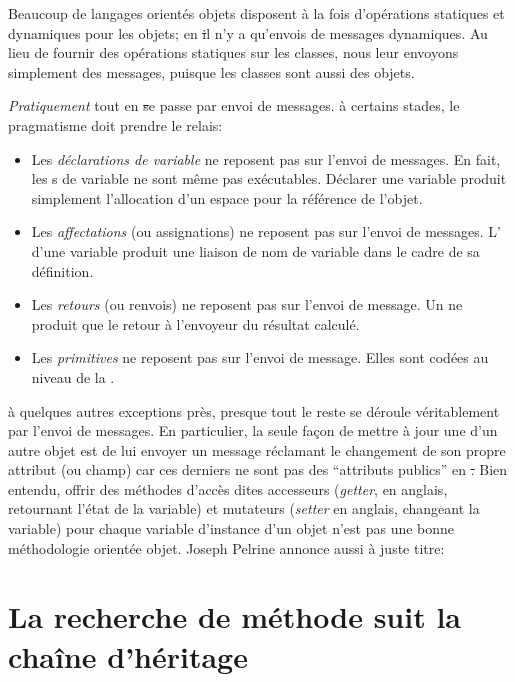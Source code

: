 \documentclass[a4paper,10pt,twoside]{book}
\begin{document}
Beaucoup de langages orientés objets disposent à la fois
d'opérations statiques et dynamiques pour les objets; en \st il n'y
a qu'envois de messages dynamiques. Au lieu de fournir des
opérations statiques sur les classes, nous leur envoyons simplement
des messages, puisque les classes sont aussi des objets. %

\emph{Pratiquement} tout en \st se passe par envoi de messages. %
à certains stades, le pragmatisme doit prendre le relais:
\begin{itemize}
  \item Les \emph{déclarations de variable} ne reposent pas sur l'envoi de messages.
  		En fait, les s de variable ne sont même pas exécutables.
  		Déclarer une variable produit simplement l'allocation d'un espace pour la référence de l'objet.
  \item Les \emph{affectations} (ou assignations) ne reposent pas sur l'envoi de messages.
  		L' d'une variable produit une liaison de nom de variable dans le cadre de sa définition.
  \item Les \emph{retours} (ou renvois) ne reposent pas sur l'envoi de message.
  		Un  ne produit que le retour à l'envoyeur du résultat calculé.
  \item Les \emph{primitives} ne reposent pas sur l'envoi de message.
  		Elles sont codées au niveau de la .
\end{itemize}

à quelques autres exceptions près, presque tout le reste se déroule véritablement par l'envoi de messages. 
En particulier, la seule façon de mettre à jour une  d'un autre objet est de lui envoyer un message réclamant le changement de son propre attribut (ou champ) car ces derniers ne sont pas des ``attributs publics'' en \st.
Bien entendu, offrir des méthodes d'accès dites accesseurs (\emph{getter}, en anglais, retournant l'état de la variable) et mutateurs (\emph{setter} en anglais, changeant la variable) pour chaque variable d'instance d'un objet n'est pas une bonne méthodologie orientée objet.
Joseph Pelrine annonce aussi à juste titre:

\section{La recherche de méthode suit la chaîne d'héritage} 
\end{document}
